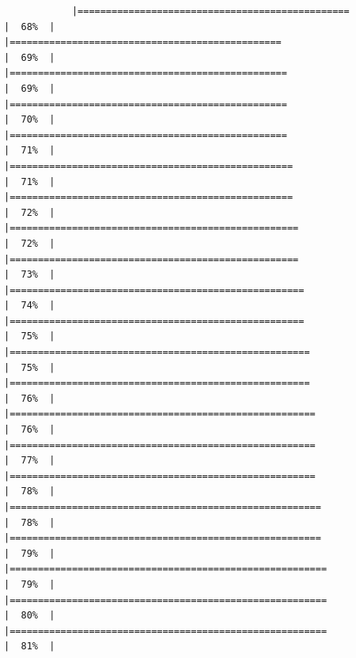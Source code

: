 \documentclass[
]{article}
\begin{document}
\begin{verbatim}
            |================================================                      |  68%  |                                                                              |================================================                      |  69%  |                                                                              |=================================================                     |  69%  |                                                                              |=================================================                     |  70%  |                                                                              |=================================================                     |  71%  |                                                                              |==================================================                    |  71%  |                                                                              |==================================================                    |  72%  |                                                                              |===================================================                   |  72%  |                                                                              |===================================================                   |  73%  |                                                                              |====================================================                  |  74%  |                                                                              |====================================================                  |  75%  |                                                                              |=====================================================                 |  75%  |                                                                              |=====================================================                 |  76%  |                                                                              |======================================================                |  76%  |                                                                              |======================================================                |  77%  |                                                                              |======================================================                |  78%  |                                                                              |=======================================================               |  78%  |                                                                              |=======================================================               |  79%  |                                                                              |========================================================              |  79%  |                                                                              |========================================================              |  80%  |                                                                              |========================================================              |  81%  |                                                                   
\end{verbatim}
\end{document}

